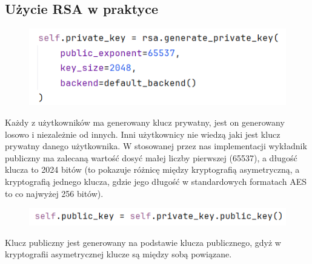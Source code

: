 \subsection{Użycie RSA w praktyce}
\begin{figure}[H]
    \centering
    \includegraphics[width=\textwidth]{Images/CodeX11.png}
\end{figure}
Każdy z użytkowników ma generowany klucz prywatny, jest on generowany losowo i niezależnie od innych. Inni użytkownicy nie wiedzą jaki jest klucz prywatny danego użytkownika. W stosowanej przez nas implementacji wykładnik publiczny ma zalecaną wartość dosyć małej liczby pierwszej (65537), a długość klucza to 2024 bitów (to pokazuje różnicę między kryptografią asymetryczną, a kryptografią jednego klucza, gdzie jego długość w standardowych formatach AES to co najwyżej 256 bitów).
\begin{figure}[H]
    \centering
    \includegraphics[width=\textwidth]{Images/CodeX12.png}
\end{figure}
Klucz publiczny jest generowany na podstawie klucza publicznego, gdyż w kryptografii asymetrycznej klucze są między sobą powiązane.
